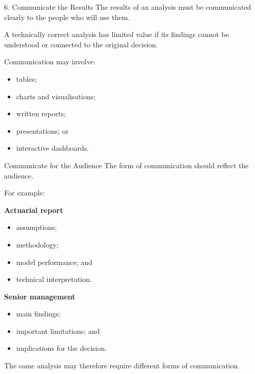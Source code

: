 \documentclass[
  ignorenonframetext,
  aspectratio=169,
]{beamer}
\providecommand{\tightlist}{%
  \setlength{\itemsep}{0pt}\setlength{\parskip}{0pt}}
\begin{document}
\begin{frame}{6. Communicate the Results}
\protect{}\label{communicate-the-results}
The results of an analysis must be communicated clearly to the people
who will use them.

A technically correct analysis has limited value if its findings cannot
be understood or connected to the original decision.

Communication may involve:

\begin{itemize}
\tightlist
\item
  tables;
\item
  charts and visualisations;
\item
  written reports;
\item
  presentations; or
\item
  interactive dashboards.
\end{itemize}
\end{frame}

\begin{frame}{Communicate for the Audience}
\protect{}\label{communicate-for-the-audience}
The form of communication should reflect the audience.

For example:

\textbf{Actuarial report}

\begin{itemize}
\tightlist
\item
  assumptions;
\item
  methodology;
\item
  model performance; and
\item
  technical interpretation.
\end{itemize}

\textbf{Senior management}

\begin{itemize}
\tightlist
\item
  main findings;
\item
  important limitations; and
\item
  implications for the decision.
\end{itemize}

The same analysis may therefore require different forms of
communication.
\end{frame}
\end{document}
